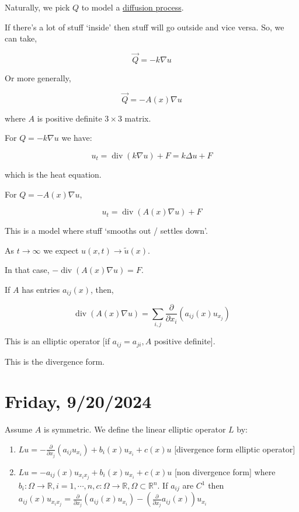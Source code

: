 \documentclass{article}
\theoremstyle{definition}
\begin{document}
Naturally, we pick \(Q\) to model a \underline{diffusion process}. 

If there's a lot of stuff `inside' then stuff will go outside and vice versa. So, we can take,

\[
    \vec{Q} = - k \nabla u
\]

Or more generally,

\[
    \vec{Q} = - A (x) \nabla u
\]

where \(A\) is positive definite \(3 \times 3\) matrix.

For \(Q = - k \nabla u\) we have:

\[
    u_t = \operatorname{div}(k\nabla u) + F = k \Delta u + F
\]

which is the heat equation.

For \(Q = - A(x)\nabla u\),

\[
    u_t = \operatorname{div} (A(x)\nabla u) + F
\]

This is a model where stuff `smooths out / settles down'.

As \(t \to \infty\) we expect \(u(x,t) \to \tilde{u}(x)\). 

In that case, \(-\operatorname{div} (A(x)\nabla u) = F\). 

If \(A\) has entries \(a_{ij}(x)\), then,

\[
    \operatorname{div}(A(x)\nabla u) = \sum_{i,j} \frac{\partial}{\partial x_i} (a_{ij}(x) u_{x_j})
\]

This is an elliptic operator [if \(a_{ij} = a_{ji}, A\) positive definite].

This is the divergence form. 


\section*{Friday, 9/20/2024}

Assume \(A\) is symmetric. We define the linear elliptic operator \(L\) by:

\begin{enumerate}[label=\roman*)]
    \item \(L u= - \frac{\partial}{\partial x_j} \left( a_{ij} u_{x_i} \right) + b_i (x) u_{x_i} + c(x)u\) [divergence form elliptic operator]
    \item \(Lu = - a_{ij} (x) u_{x_i x_j} + b_i(x) u_{x_i} + c(x) u\) [non divergence form] where \(b_i : \Omega \to \mathbb{R}, i = 1,\cdots , n, c:\Omega \to \mathbb{R} , \Omega \subset \mathbb{R}^n\). If \(a_{ij}\) are \(C^1\) then \(a_{ij}(x) u_{x_i x_j} = \frac{\partial}{\partial x_j} (a_{ij} (x) u_{x_i}) - \left(\frac{\partial}{\partial x_j} a_{ij}(x)\right) u_{x_i} \) 
\end{enumerate} 
\end{document}
